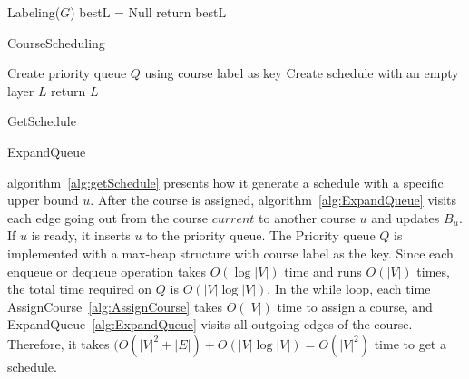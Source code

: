 \documentclass[letterpaper,12pt]{article}
\theoremstyle{definition}
\begin{document}
\begin{algorithm}[H]
Labeling($G$)\;
bestL = Null\;
return bestL\;

\caption{CourseScheduling}\label{alg:coursescheduling}
\end{algorithm}
\bigskip
\begin{algorithm}[H]
Create priority queue $Q$ using course label as key\;
Create schedule with an empty layer $L$\;
return $L$\;
\caption{GetSchedule}\label{alg:getSchedule}
\end{algorithm}
\bigskip
\begin{algorithm}[H]
\caption{ExpandQueue}\label{alg:ExpandQueue}
\end{algorithm}



\bigskip

algorithm~\ref{alg:getSchedule} presents how it generate a schedule with a specific upper bound $u$. After the course is assigned, algorithm~\ref{alg:ExpandQueue} visits each edge going out from the course $current$ to another course $u$ and updates $B_u$. If $u$ is ready, it inserts $u$ to the priority queue. The Priority queue $Q$ is implemented with a max-heap structure with course label as the key. Since each enqueue or dequeue operation takes $O(\log |V|)$ time and runs $O(|V|)$ times, the total time required on $Q$ is $O(|V|\log|V|)$. In the while loop, each time AssignCourse~\ref{alg:AssignCourse} takes $O(|V|)$ time to assign a course, and ExpandQueue~\ref{alg:ExpandQueue} visits all outgoing edges of the course. Therefore, it takes $(O(|V|^2+|E|)+O(|V|\log|V|)=O(|V|^2)$ time to get a schedule. 
\end{document}
